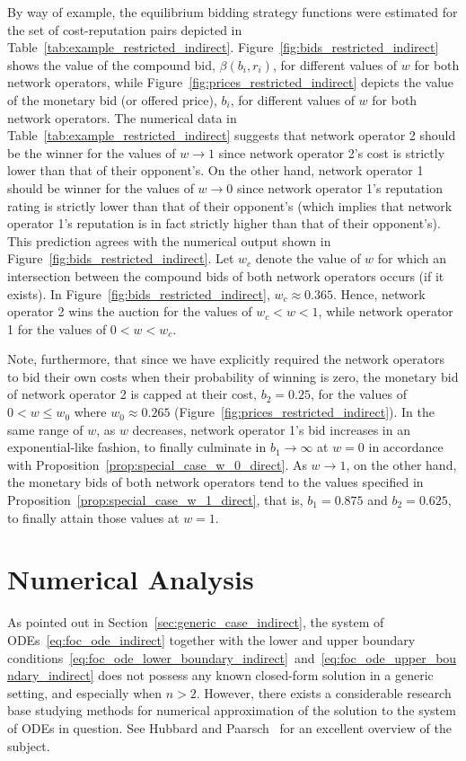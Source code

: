 By way of example, the equilibrium bidding strategy functions were estimated for the set of cost-reputation pairs depicted in Table~\ref{tab:example_restricted_indirect}. Figure~\ref{fig:bids_restricted_indirect} shows the value of the compound bid, $\beta(b_i,r_i)$, for different values of $w$ for both network operators, while Figure~\ref{fig:prices_restricted_indirect} depicts the value of the monetary bid (or offered price), $b_i$, for different values of $w$ for both network operators. The numerical data in Table~\ref{tab:example_restricted_indirect} suggests that network operator 2 should be the winner for the values of $w\rightarrow 1$ since network operator 2's cost is strictly lower than that of their opponent's. On the other hand, network operator 1 should be winner for the values of $w\rightarrow 0$ since network operator 1's reputation rating is strictly lower than that of their opponent's (which implies that network operator 1's reputation is in fact strictly higher than that of their opponent's). This prediction agrees with the numerical output shown in Figure~\ref{fig:bids_restricted_indirect}. Let $w_c$ denote the value of $w$ for which an intersection between the compound bids of both network operators occurs (if it exists). In Figure~\ref{fig:bids_restricted_indirect}, $w_c\approx 0.365$. Hence, network operator 2 wins the auction for the values of $w_c < w < 1$, while network operator 1 for the values of $0 < w < w_c$.

Note, furthermore, that since we have explicitly required the network operators to bid their own costs when their probability of winning is zero, the monetary bid of network operator 2 is capped at their cost, $b_2 = 0.25$, for the values of $0 < w \le w_0$ where $w_0\approx 0.265$ (Figure~\ref{fig:prices_restricted_indirect}). In the same range of $w$, as $w$ decreases, network operator 1's bid increases in an exponential-like fashion, to finally culminate in $b_1\to\infty$ at $w=0$ in accordance with Proposition~\ref{prop:special_case_w_0_direct}. As $w\to 1$, on the other hand, the monetary bids of both network operators tend to the values specified in Proposition~\ref{prop:special_case_w_1_direct}, that is, $b_1=0.875$ and $b_2=0.625$, to finally attain those values at $w=1$.

\section{Numerical Analysis} %
\label{sec:numerical_analysis_indirect}
As pointed out in Section~\ref{sec:generic_case_indirect}, the system of ODEs~\eqref{eq:foc_ode_indirect} together with the lower and upper boundary conditions~\eqref{eq:foc_ode_lower_boundary_indirect}~and~\eqref{eq:foc_ode_upper_boundary_indirect} does not possess any known closed-form solution in a generic setting, and especially when $n>2$. However, there exists a considerable research base studying methods for numerical approximation of the solution to the system of ODEs in question. See Hubbard and Paarsch~\cite{HubbardPaarsch2011} for an excellent overview of the subject.

